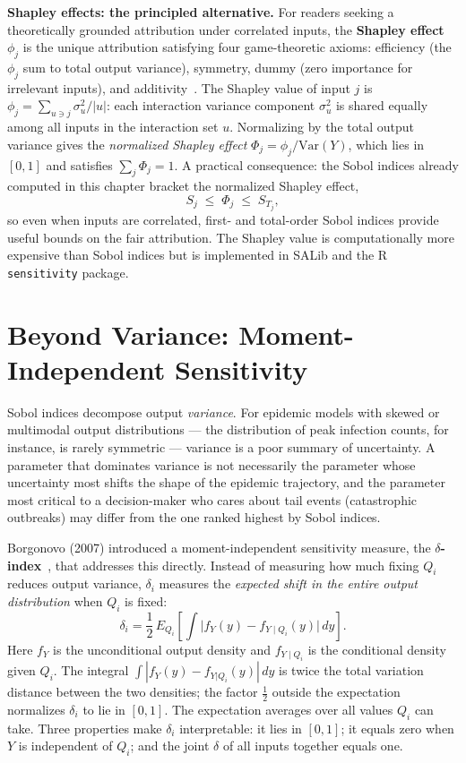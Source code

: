 \textbf{Shapley effects: the principled alternative.}
For readers seeking a theoretically grounded attribution under correlated
inputs, the \textbf{Shapley effect} $\phi_j$ is the unique attribution
satisfying four game-theoretic axioms: efficiency (the $\phi_j$ sum to
total output variance), symmetry, dummy (zero importance for irrelevant inputs),
and additivity~\cite{owen2014sobol}.
The Shapley value of input $j$ is $\phi_j = \sum_{u \ni j} \sigma_u^2 / |u|$:
each interaction variance component $\sigma_u^2$ is shared equally among
all inputs in the interaction set $u$.
Normalizing by the total output variance gives the \emph{normalized Shapley
effect} $\Phi_j = \phi_j / \mathrm{Var}(Y)$, which lies in $[0,1]$ and
satisfies $\sum_j \Phi_j = 1$.
A practical consequence: the Sobol indices already computed in this chapter
bracket the normalized Shapley effect,
\[
  S_j \;\leq\; \Phi_j \;\leq\; S_{T_j},
\]
so even when inputs are correlated, first- and total-order Sobol indices
provide useful bounds on the fair attribution.
The Shapley value is computationally more expensive than Sobol indices
but is implemented in SALib and the R \texttt{sensitivity} package.

\section{Beyond Variance: Moment-Independent Sensitivity}
\label{sec:borgonovo}

Sobol indices decompose output \emph{variance}.
For epidemic models with skewed or multimodal output distributions ---
the distribution of peak infection counts, for instance, is rarely
symmetric --- variance is a poor summary of uncertainty.
A parameter that dominates variance is not necessarily the parameter
whose uncertainty most shifts the shape of the epidemic trajectory,
and the parameter most critical to a decision-maker who cares about
tail events (catastrophic outbreaks) may differ from the one ranked
highest by Sobol indices.

Borgonovo (2007) introduced a moment-independent sensitivity measure,
the \textbf{$\delta$-index}~\cite{borgonovo2007new}, that addresses
this directly.
Instead of measuring how much fixing $Q_i$ reduces output variance,
$\delta_i$ measures the \emph{expected shift in the entire output distribution}
when $Q_i$ is fixed:
\begin{equation}
  \delta_i = \frac{1}{2}\,E_{Q_i}\!\left[\int \bigl|f_Y(y) - f_{Y\mid Q_i}(y)\bigr|\,dy\right].
  \label{eq:delta}
\end{equation}
Here $f_Y$ is the unconditional output density and $f_{Y\mid Q_i}$ is
the conditional density given $Q_i$.
The integral $\int|f_Y(y) - f_{Y|Q_i}(y)|\,dy$ is twice the total
variation distance between the two densities; the factor $\frac{1}{2}$
outside the expectation normalizes $\delta_i$ to lie in $[0,1]$.
The expectation averages over all values $Q_i$ can take.
Three properties make $\delta_i$ interpretable: it lies in $[0,1]$;
it equals zero when $Y$ is independent of $Q_i$; and the joint
$\delta$ of all inputs together equals one.

